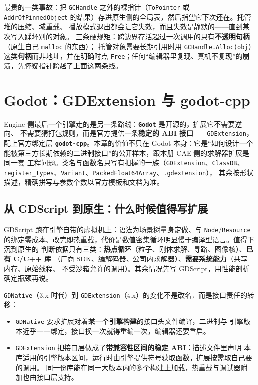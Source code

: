 \documentclass[12pt,a4paper,fontset=fandol]{ctexbook}
\newcommand{\Tp}[1]{\texttt{#1}}
\newcommand{\Bk}{\discretionary{}{}{}}
\newcommand{\Lib}[1]{\textbf{\texttt{#1}}}
\newcommand{\Lang}[1]{\textsf{#1}}
\newcommand{\CL}{\Lang{C}}
\newcommand{\CPP}{\Lang{C++}}
\newcommand{\DomCAE}{\Lang{CAE}}
\newcommand{\DomEngine}{\Lang{Engine}}
\begin{document}
\begin{warning}[title={在插件里长期持有托管对象指针}]
最贵的一类事故：把 \Tp{GCHandle} 之外的裸指针（\Tp{ToPointer} 或 \Tp{AddrOfPinnedObject}
的结果）存进原生侧的全局表，然后指望它下次还在。托管堆的压缩、域重载、
播放模式退出都会让它失效，而且失效是静默的——直到某次写入踩坏别的对象。
三条硬规矩：跨边界存活超过一次调用的只有\textbf{不透明句柄}（原生自己 \Tp{malloc} 的东西）；
托管对象需要长期引用时用 \Tp{GCHandle.Alloc(obj)} 这类\textbf{句柄}而非地址，并在明确时点
\Tp{Free}；任何``编辑器里复现、真机不复现''的崩溃，先怀疑指针跨越了上面这两条线。
\end{warning}

\chapter{Godot：GDExtension 与 godot-cpp}
\label{ch:ch12-godot-ext}

\DomEngine{} 侧最后一个引擎走的是另一条路线：\Lib{Godot} 是开源的，扩展它不需要逆向、
不需要猜打包规则，而是官方提供一条\textbf{稳定的 ABI 接口}——\Tp{GDExtension}，
配上官方绑定层 \Lib{godot-cpp}。本章的价值不只在 Godot 本身：它是``如何设计一个
能被第三方长期依赖的二进制接口''的公开样本，跟本册 \DomCAE{} 侧的求解器扩展是同一套
工程问题。类名与函数名只写有把握的一族（\Tp{GDExtension}、\Tp{ClassDB}、
\Tp{register\_types}、\Tp{Variant}、\Tp{PackedFloat64Array}、\Tp{.gdextension}），
其余按形状描述，精确拼写与参数个数以官方模板和文档为准。

\section{从 GDScript 到原生：什么时候值得写扩展}
\label{sec:ch12-why-native}

\Lang{GDScript} 跑在引擎自带的虚拟机上：语法为场景树量身定做、与 \Tp{Node}/{\Bk}\Tp{Resource}
的绑定零成本、改完即热重载，代价是数值密集循环明显慢于编译型语言。值得下沉到原生的
判断依据只有三类：\textbf{热点循环}（粒子、刚体求解、寻路、图像核）、\textbf{已有 \CL/{\Bk}\CPP{} 库}
（厂商 SDK、编解码器、公司内求解器）、\textbf{需要系统能力}（共享内存、原始线程、
不受沙箱允许的调用）。其余情况先写 \Lang{GDScript}，用性能剖析确定瓶颈再说。

\Tp{GDNative}（3.x 时代）到 \Tp{GDExtension}（4.x）的变化不是改名，而是接口责任的转移：

\begin{itemize}
  \item \Tp{GDNative} 要求扩展对着\textbf{某一个引擎构建}的接口头文件编译，二进制与
        引擎版本近乎一一绑定，接口换一次就得重编一次，编辑器还要重启。
  \item \Tp{GDExtension} 把接口层做成了\textbf{带兼容性区间的稳定 ABI}：描述文件里声明
        本库适用的引擎版本区间，运行时由引擎提供符号获取函数，扩展按需取自己要的调用。
        同一份库能在同一大版本内的多个构建上加载，热重载与调试器附加也由接口层支持。
\end{itemize}
\end{document}
